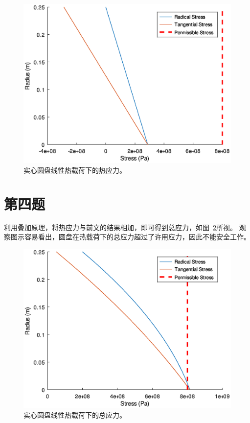 \begin{figure}[!tb]
    \centering
    \includegraphics[width=0.8\linewidth]{part-2-question-3.eps}
    \caption{实心圆盘线性热载荷下的热应力。}
    \label{fig:part-2-question-3}
\end{figure}

\section{第四题}

利用叠加原理，将热应力与前文的结果相加，即可得到总应力，如图~\ref{fig:part-2-question-4}所视。
观察图示容易看出，圆盘在热载荷下的总应力超过了许用应力，因此不能安全工作。

\begin{figure}[!tb]
    \centering
    \includegraphics[width=0.8\linewidth]{part-2-question-4.eps}
    \caption{实心圆盘线性热载荷下的总应力。}
    \label{fig:part-2-question-4}
\end{figure}
